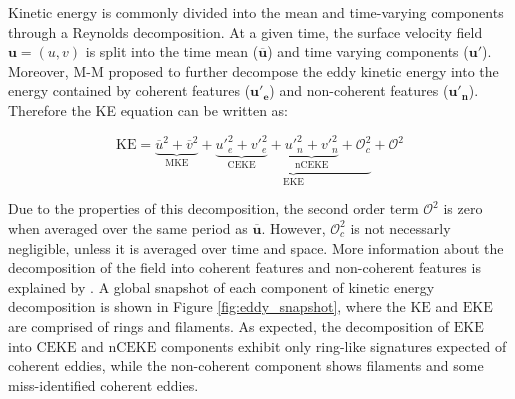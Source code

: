 \documentclass[draft,linenumbers]{agujournal2019}
\newcommand{\mKE}{\textrm{MKE}}
\newcommand{\KE}{\textrm{KE}}
\newcommand{\EKE}{\textrm{EKE}}
\newcommand{\CEKE}{\textrm{CEKE}}
\newcommand{\nCEKE}{\textrm{nCEKE}}
\begin{document}
	Kinetic energy is commonly divided into the mean and time-varying components through a Reynolds decomposition. At a given time, the surface velocity field $\mathbf{u} = (u,v)$ is split into the time mean ($\mathbf{\overline{u}}$) and time varying components ($\mathbf{u'}$). Moreover, M-M proposed to further decompose the eddy kinetic energy into the energy contained by coherent features ($\mathbf{u'_e}$) and non-coherent features ($\mathbf{u'_n}$). Therefore the KE equation can be written as:

	\begin{equation}
		\mathrm{KE} = \underbrace{\overline{u}^2 + \overline{v}^2}_{\mKE} + 
		\underbrace{\underbrace{{u'}_e^2+{v'}_e^2}_{\CEKE}  + \underbrace{{u'}_n^2+{v'}_n^2}_{\nCEKE} + \mathcal{O}_c^2 }_{\EKE} + \mathcal{O}^2
	\end{equation}

	Due to the properties of this decomposition, the second order term $\mathcal{O}^2$ is zero when averaged over the same period as $\mathbf{\overline{u}}$. However, $\mathcal{O}_c^2$ is not necessarly negligible, unless it is averaged over time and space. More information about the decomposition of the field into coherent features and non-coherent features is explained by \citet{Martinez_TKE_2019}. A global snapshot of each component of kinetic energy decomposition is shown in Figure \ref{fig:eddy_snapshot}, where the $\KE$ and $\EKE$ are comprised of rings and filaments. As expected, the decomposition of $\EKE$ into $\CEKE$ and $\nCEKE$ components exhibit only ring-like signatures expected of coherent eddies, while the non-coherent component shows filaments and some miss-identified coherent eddies.
\end{document}
